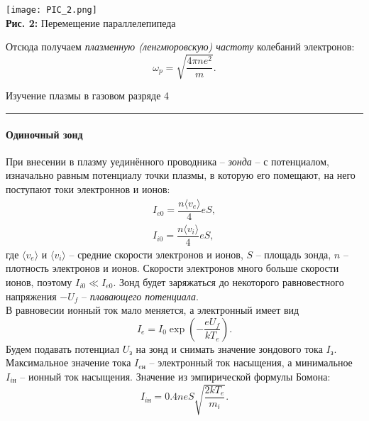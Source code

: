 \documentclass[12pt,a4paper]{scrartcl}
\begin{document}
\begin{center}
	\texttt{[image: PIC\_2.png]}
	\\\textbf{Рис. 2:} Перемещение параллелепипеда
\end{center}
Отсюда получаем \textit{плазменную (ленгмюровскую) частоту} колебаний электронов:
\begin{equation}
\omega_p = \sqrt{\dfrac{4\pi ne^2}{m}}.
\end{equation}	

	\newpage


	\begin{flushleft}
		\footnotesize{Изучение плазмы в газовом разряде} \hspace{\fill} \footnotesize{4}
		\\[-0.3cm]\noindent\rule{\textwidth}{0.3pt}
	\end{flushleft}	
		
\paragraph{Одиночный зонд} \hfill

При внесении в плазму уединённого проводника -- \textit{зонда} -- с потенциалом, изначально равным потенциалу точки плазмы, в которую его помещают, на него поступают токи электроннов и ионов:
\begin{equation}
\begin{array}{c}
I_{e0} = \dfrac{n \langle v_e \rangle}{4}eS,\\
I_{i0} = \dfrac{n \langle v_i \rangle}{4}eS,
\end{array}
\end{equation}
где $\langle v_e \rangle$ и $\langle v_i \rangle$ -- средние скорости электронов и ионов, $S$ -- площадь зонда, $n$ -- плотность электронов и ионов. Скорости электронов много больше скорости ионов, поэтому $I_{i0} \ll I_{e0}$. Зонд будет заряжаться до некоторого равновестного напряжения $-U_f$ -- \textit{плавающего потенциала}.\\ 

В равновесии ионный ток мало меняется, а электронный имеет вид
$$
I_e = I_0 \exp\left( -\dfrac{eU_f}{kT_e} \right).
$$
Будем подавать потенциал $U_\text{з}$ на зонд и снимать значение зондового тока $I_\text{з}$. Максимальное значение тока $I_{e\text{н}}$ -- электронный ток насыщения, а минимальное $I_{i\text{н}}$ -- ионный ток насыщения. Значение из эмпирической формулы Бомона:
\begin{equation}
I_{i\text{н}} = 0.4 neS \sqrt{\dfrac{2kT_e}{m_i}}.
\end{equation}	
\end{document}
